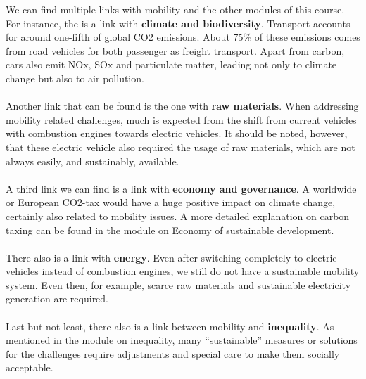 \documentclass[../summary.tex]{subfiles}
\begin{document}
	We can find multiple links with mobility and the other modules of this course. For instance, the is a link with \textbf{climate and biodiversity}. Transport accounts for around one-fifth of global CO2 emissions. About 75\% of these emissions comes from road vehicles for both passenger as freight transport. Apart from carbon, cars also emit NOx, SOx and particulate matter, leading not only to climate change but also to air pollution. 
	\\\\
	Another link that can be found is the one with \textbf{raw materials}. When addressing mobility related challenges, much is expected from the shift from current vehicles with combustion engines towards electric vehicles. It should be noted, however, that these electric vehicle also required the usage of raw materials, which are not always easily, and sustainably, available. 
	\\\\
	A third link we can find is a link with \textbf{economy and governance}. A worldwide or European CO2-tax would have a huge positive impact on climate change, certainly also related to mobility issues. A more detailed explanation on carbon taxing can be found in the module on Economy of sustainable development. 
	\\\\
	There also is a link with \textbf{energy}. Even after switching completely to electric vehicles instead of combustion engines, we still do not have a sustainable mobility system. Even then, for example, scarce raw materials and sustainable electricity generation are required.
	\\\\
	Last but not least, there also is a link between mobility and \textbf{inequality}. As mentioned in the module on inequality, many “sustainable” measures or solutions for the challenges require adjustments and special care to make them socially acceptable.
	
\end{document}
